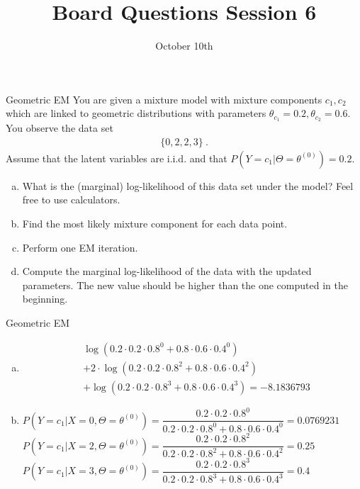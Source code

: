 \documentclass{beamer}\usepackage[]{graphicx}\usepackage[]{color}
\title{Board Questions Session 6}
\date{October 10th}
\begin{document}
\begin{frame}{Geometric EM}
\small
You are given a mixture model with mixture components $ c_{1},c_{2} $ which are linked to geometric
distributions with parameters $ \theta_{c_{1}} = 0.2, \theta_{c_{2}} = 0.6 $. You
observe the data set
\begin{align*}
\{0, 2, 2, 3\} \ .
\end{align*}
Assume that the latent variables are i.i.d. and that $ P(Y=c_{1}|\Theta=\theta^{(0)}) = 0.2 $.
\begin{enumerate}[a)]
\item What is the (marginal) log-likelihood of this data set under the model? Feel free to use
calculators.
\item Find the most likely mixture component for each data point.
\item Perform one EM iteration.
\item Compute the marginal log-likelihood of the data with the updated parameters. The new value
should be higher than the one computed in the beginning.
\end{enumerate}
\end{frame}

\begin{frame}{Geometric EM}
\small
\begin{enumerate}[a)]
\item \begin{align*}
&\log(0.2\cdot 0.2\cdot 0.8^{0} + 0.8 \cdot 0.6 \cdot 0.4^{0}) \\
&+ 2\cdot \log(0.2\cdot 0.2 \cdot 0.8^{2} + 0.8\cdot 0.6 \cdot 0.4^{2}) \\
&+ \log(0.2\cdot 0.2 \cdot 0.8^{3} + 0.8\cdot 0.6 \cdot 0.4^{3})
= \ensuremath{-8.1836793}
\end{align*}
\item $ P(Y = c_{1}|X=0, \Theta=\theta^{(0)}) = \dfrac{0.2\cdot 0.2\cdot 0.8^{0}}{0.2\cdot 0.2\cdot 0.8^{0} + 0.8 \cdot 0.6 \cdot 0.4^{0}} = 0.0769231 $
\\ \vspace{.4cm}
$ P(Y = c_{1}|X=2, \Theta=\theta^{(0)}) = \dfrac{0.2\cdot 0.2\cdot 0.8^{2}}{0.2\cdot 0.2\cdot 0.8^{2} + 0.8 \cdot 0.6 \cdot 0.4^{2}} = 0.25 $
\\ \vspace{.4cm}
$ P(Y = c_{1}|X=3, \Theta=\theta^{(0)}) = \dfrac{0.2\cdot 0.2\cdot 0.8^{3}}{0.2\cdot 0.2\cdot 0.8^{3} + 0.8 \cdot 0.6 \cdot 0.4^{3}} = 0.4 $
\end{enumerate}
\end{frame}
\end{document}

